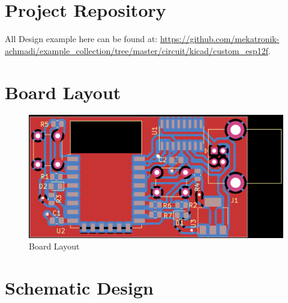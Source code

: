 \documentclass[a4paper,12pt,oneside,pdflatex,italian,final,twocolumn]{article}
\begin{document}
	\raggedright

	\section{Project Repository}

	All Design example here can be found at: \url{https://github.com/mekatronik-achmadi/example_collection/tree/master/circuit/kicad/custom_esp12f}.

	\section{Board Layout}

	\begin{figure}[h]
		\centering
		\includegraphics[width=\textwidth]{images/custom_esp12f-brd.png}
		\caption{Board Layout}
	\end{figure}

	\section{Schematic Design}

	\newpage
	

	\raggedright

	\newpage
\end{document}

